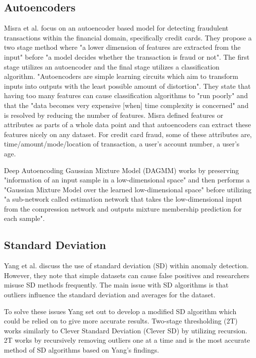 \documentclass[journal]{IEEEtran}
\begin{document}
\subsection{Autoencoders}
\noindent Misra et al. focus on an autoencoder based model for detecting fraudulent transactions within the financial domain, specifically credit cards\cite{Misra2020}. They propose a two stage method where "a lower dimension of features are extracted from the input" before "a model decides whether the transaction is fraud or not". The first stage utilizes an autoencoder and the final stage utilizes a classification algorithm. "Autoencoders are simple learning circuits which aim to transform inputs into outputs with the least possible amount of distortion"\cite{Baldi2011}. They state that having too many features can cause classification algorithms to "run poorly" and that the "data becomes very expensive [when] time complexity is concerned" and is resolved by reducing the number of features. Misra defined features or attributes as parts of a whole data point and that autoencoders can extract these features nicely on any dataset. For credit card fraud, some of these attributes are, time/amount/mode/location of transaction, a user's account number, a user's age.

Deep Autoencoding Gaussian Mixture Model (DAGMM) works by preserving "information of an input sample in a low-dimensional space" and then performs a "Gaussian Mixture Model over the learned low-dimensional space" before utilizing "a sub-network called estimation network that takes the low-dimensional input from the compression network and outputs mixture membership prediction for each sample"\cite{Zong2018}.

\subsection{Standard Deviation}
\noindent Yang et al. discuss the use of standard deviation (SD) within anomaly detection\cite{Yang2019}. However, they note that simple datasets can cause false positives\cite{Pollet2017} and researchers misuse SD methods frequently\cite{Simmons2016}. The main issue with SD algorithms is that outliers influence the standard deviation and averages for the dataset.

To solve these issues Yang set out to develop a modified SD algorithm which could be relied on to give more accurate results. Two-stage thresholding (2T)\cite{Yang2019} works similarly to Clever Standard Deviation (Clever SD)\cite{Buzzi2011} by utilizing recursion. 2T works by recursively removing outliers one at a time and is the most accurate method of SD algorithms based on Yang's findings.
\end{document}
